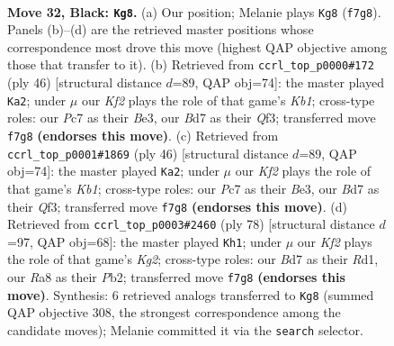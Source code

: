 \documentclass[11pt]{article}
\begin{document}
\clearpage

\begin{figure}[p]\centering
\begin{subfigure}{0.46\textwidth}\centering
\resizebox{\linewidth}{!}{%
\newchessgame
\chessboard[
  setfen={r1r5/pppb1k2/2n2Q2/qP6/3Pp3/6P1/8/RNB2RK1 b - - 0 32},
  showmover=false,
  pgfstyle=straightmove, color=movearrow, markmove={f7-g8}
]}
\caption{}
\end{subfigure}\hfill
\begin{subfigure}{0.46\textwidth}\centering
\resizebox{\linewidth}{!}{%
\newchessgame
\chessboard[
  setfen={2r1r1k1/1p3p2/p2b2p1/3p1NP1/7P/1P2BQ2/1Pq5/1K1R2R1 w - - 0 24},
  showmover=false,
  pgfstyle=straightmove, color=movearrow, markmove={b1-a2}
]}
\caption{}
\end{subfigure}
\\[4pt]
\begin{subfigure}{0.46\textwidth}\centering
\resizebox{\linewidth}{!}{%
\newchessgame
\chessboard[
  setfen={2r1r1k1/1p3p2/p2b2p1/3p1NP1/7P/1P2BQ2/1Pq5/1K1R2R1 w - - 0 24},
  showmover=false,
  pgfstyle=straightmove, color=movearrow, markmove={b1-a2}
]}
\caption{}
\end{subfigure}\hfill
\begin{subfigure}{0.46\textwidth}\centering
\resizebox{\linewidth}{!}{%
\newchessgame
\chessboard[
  setfen={1r2r1k1/7p/2QP1p2/1p6/4P1P1/3RqpP1/1P4K1/3R4 w - - 0 40},
  showmover=false,
  pgfstyle=straightmove, color=movearrow, markmove={g2-h1}
]}
\caption{}
\end{subfigure}
\caption{\textbf{Move 32, Black: \texttt{Kg8}.} (a) Our position; Melanie plays \texttt{Kg8} (\texttt{f7g8}). Panels (b)--(d) are the retrieved master positions whose correspondence most drove this move (highest QAP objective among those that transfer to it). (b) Retrieved from \texttt{ccrl\_top\_p0000\#172} (ply 46) [structural distance $d$=89, QAP obj=74]: the master played \texttt{Ka2}; under $\mu$ our \emph{Kf2} plays the role of that game's \emph{Kb1}; cross-type roles: our \emph{P}c7 as their \emph{B}e3, our \emph{B}d7 as their \emph{Q}f3; transferred move \texttt{f7g8} \textbf{(endorses this move)}. (c) Retrieved from \texttt{ccrl\_top\_p0001\#1869} (ply 46) [structural distance $d$=89, QAP obj=74]: the master played \texttt{Ka2}; under $\mu$ our \emph{Kf2} plays the role of that game's \emph{Kb1}; cross-type roles: our \emph{P}c7 as their \emph{B}e3, our \emph{B}d7 as their \emph{Q}f3; transferred move \texttt{f7g8} \textbf{(endorses this move)}. (d) Retrieved from \texttt{ccrl\_top\_p0003\#2460} (ply 78) [structural distance $d$=97, QAP obj=68]: the master played \texttt{Kh1}; under $\mu$ our \emph{Kf2} plays the role of that game's \emph{Kg2}; cross-type roles: our \emph{B}d7 as their \emph{R}d1, our \emph{R}a8 as their \emph{P}b2; transferred move \texttt{f7g8} \textbf{(endorses this move)}. Synthesis: 6 retrieved analogs transferred to \texttt{Kg8} (summed QAP objective 308, the strongest correspondence among the candidate moves); Melanie committed it via the \texttt{search} selector.}
\label{fig:thought-m63}
\end{figure}
\end{document}
